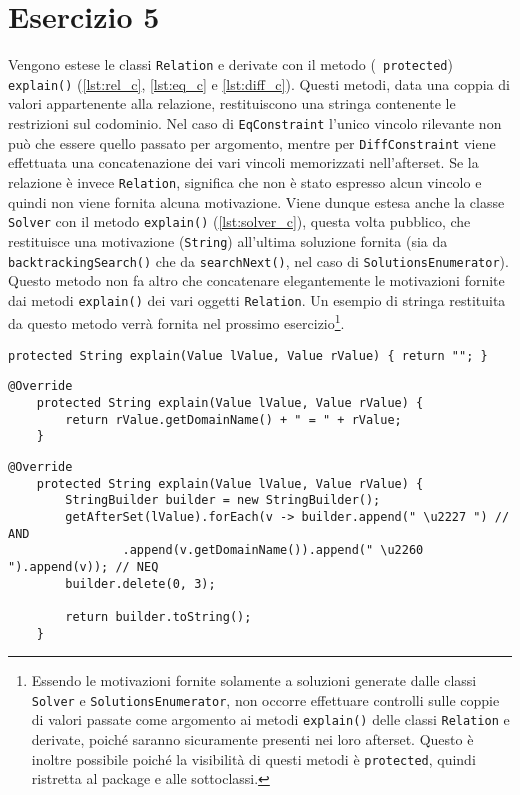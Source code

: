 \section*{Esercizio 5}

Vengono estese le classi {\tt Relation} e derivate con il metodo ({\tt
protected}) {\tt explain()} (\autoref{lst:rel_c}, \ref{lst:eq_c} e
\ref{lst:diff_c}). Questi metodi, data una coppia di valori appartenente alla
relazione, restituiscono una stringa contenente le restrizioni sul codominio.
Nel caso di {\tt EqConstraint} l'unico vincolo rilevante non può che essere
quello passato per argomento, mentre per {\tt DiffConstraint} viene effettuata
una concatenazione dei vari vincoli memorizzati nell'afterset. Se la relazione è
invece {\tt Relation}, significa che non è stato espresso alcun vincolo e quindi
non viene fornita alcuna motivazione. Viene dunque estesa anche la classe {\tt
Solver} con il metodo {\tt explain()} (\autoref{lst:solver_c}), questa volta
pubblico, che restituisce una motivazione ({\tt String}) all'ultima soluzione
fornita (sia da {\tt backtrackingSearch()} che da {\tt searchNext()}, nel caso
di {\tt SolutionsEnumerator}). Questo metodo non fa altro che concatenare
elegantemente le motivazioni fornite dai metodi {\tt explain()} dei vari oggetti
{\tt Relation}. Un esempio di stringa restituita da questo metodo verrà fornita
nel prossimo esercizio\footnote{Essendo le motivazioni fornite solamente a
soluzioni generate dalle classi {\tt Solver} e {\tt SolutionsEnumerator}, non
occorre effettuare controlli sulle coppie di valori passate come argomento ai
metodi {\tt explain()} delle classi {\tt Relation} e derivate, poiché saranno
sicuramente presenti nei loro afterset. Questo è inoltre possibile poiché la
visibilità di questi metodi è {\tt protected}, quindi ristretta al package e
alle sottoclassi.}.
%
\begin{lstlisting}[caption=Relation.java (cont.), label=lst:rel_c, firstnumber=30]
    protected String explain(Value lValue, Value rValue) { return ""; }
\end{lstlisting}
%
\begin{lstlisting}[caption=EqConstraint.java (cont.), label=lst:eq_c, firstnumber=15]
    @Override
    protected String explain(Value lValue, Value rValue) {
        return rValue.getDomainName() + " = " + rValue;
    }
\end{lstlisting}
%
\begin{lstlisting}[caption=DiffConstraint.java (cont.), label=lst:diff_c, firstnumber=16]
    @Override
    protected String explain(Value lValue, Value rValue) {
        StringBuilder builder = new StringBuilder();
        getAfterSet(lValue).forEach(v -> builder.append(" \u2227 ") // AND
                .append(v.getDomainName()).append(" \u2260 ").append(v)); // NEQ
        builder.delete(0, 3);

        return builder.toString();
    }
\end{lstlisting}
